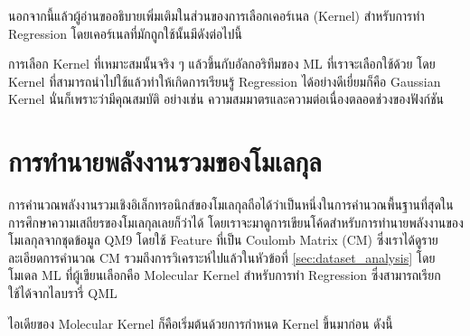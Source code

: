 นอกจากนี้แล้วผู้อ่านขออธิบายเพิ่มเติมในส่วนของการเลือกเคอร์เนล (Kernel) สำหรับการทำ Regression โดยเคอร์เนลที่มักถูกใช้นั้นมีดังต่อไปนี้


การเลือก Kernel ที่เหมาะสมนั้นจริง ๆ แล้วขึ้นกับอัลกอริทึมของ ML ที่เราจะเลือกใช้ด้วย โดย Kernel ที่สามารถนำไปใช้แล้วทำให้เกิดการเรียนรู้
Regression ได้อย่างดีเยี่ยมก็คือ Gaussian Kernel นั่นก็เพราะว่ามีคุณสมบัติ อย่างเช่น ความสมมาตรและความต่อเนื่องตลอดช่วงของฟังก์ชัน

\section{การทำนายพลังงานรวมของโมเลกุล}
\label{sec:pred_tot_ener}

การคำนวณพลังงานรวมเชิงอิเล็กทรอนิกส์ของโมเลกุลถือได้ว่าเป็นหนึ่งในการคำนวณพื้นฐานที่สุดในการศึกษาความเสถียรของโมเลกุลเลยก็ว่าได้
โดยเราจะมาดูการเขียนโค้ดสำหรับการทำนายพลังงานของโมเลกุลจากชุดข้อมูล QM9 โดยใช้ Feature ที่เป็น Coulomb Matrix (CM) 
ซึ่งเราได้ดูรายละเอียดการคำนวณ CM รวมถึงการวิเคราะห์ไปแล้วในหัวข้อที่ \ref{sec:dataset_analysis} โดยโมเดล ML ที่ผู้เขียนเลือกคือ
Molecular Kernel สำหรับการทำ Regression ซึ่งสามารถเรียกใช้ได้จากไลบรารี่ QML

ไอเดียของ Molecular Kernel ก็คือเริ่มต้นด้วยการกำหนด Kernel ขึ้นมาก่อน ดังนี้

